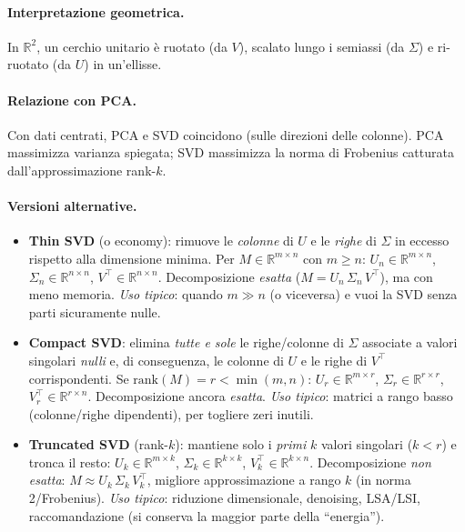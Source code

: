 \paragraph{Interpretazione geometrica.} In $\mathbb{R}^2$, un cerchio unitario è ruotato (da $V$), scalato lungo i semiassi (da $\Sigma$) e ri-ruotato (da $U$) in un'ellisse.

\paragraph{Relazione con PCA.} Con dati centrati, PCA e SVD coincidono (sulle direzioni delle colonne). PCA massimizza varianza spiegata; SVD massimizza la norma di Frobenius catturata dall'approssimazione rank-$k$.

\paragraph{Versioni alternative.}
\begin{itemize}
  \item \textbf{Thin SVD} (o economy): rimuove le \emph{colonne} di $U$ e le \emph{righe} di $\Sigma$ in eccesso rispetto alla dimensione minima.
        Per $M\in\mathbb{R}^{m\times n}$ con $m\ge n$: $U_n\in\mathbb{R}^{m\times n}$, $\Sigma_n\in\mathbb{R}^{n\times n}$, $V^{\top}\in\mathbb{R}^{n\times n}$.
        Decomposizione \emph{esatta} ($M=U_n\,\Sigma_n\,V^{\top}$), ma con meno memoria.
        \textit{Uso tipico}: quando $m\gg n$ (o viceversa) e vuoi la SVD senza parti sicuramente nulle.

  \item \textbf{Compact SVD}: elimina \emph{tutte e sole} le righe/colonne di $\Sigma$ associate a valori singolari \emph{nulli}
        e, di conseguenza, le colonne di $U$ e le righe di $V^{\top}$ corrispondenti.
        Se $\mathrm{rank}(M)=r<\min(m,n)$: $U_r\in\mathbb{R}^{m\times r}$, $\Sigma_r\in\mathbb{R}^{r\times r}$, $V_r^{\top}\in\mathbb{R}^{r\times n}$.
        Decomposizione ancora \emph{esatta}.
        \textit{Uso tipico}: matrici a rango basso (colonne/righe dipendenti), per togliere zeri inutili.

  \item \textbf{Truncated SVD} (rank-$k$): mantiene solo i \emph{primi} $k$ valori singolari ($k<r$) e tronca il resto:
        $U_k\in\mathbb{R}^{m\times k}$, $\Sigma_k\in\mathbb{R}^{k\times k}$, $V_k^{\top}\in\mathbb{R}^{k\times n}$.
        Decomposizione \emph{non esatta}: $M\approx U_k\,\Sigma_k\,V_k^{\top}$, migliore approssimazione a rango $k$ (in norma 2/Frobenius).
        \textit{Uso tipico}: riduzione dimensionale, denoising, LSA/LSI, raccomandazione (si conserva la maggior parte della “energia”).
\end{itemize}


